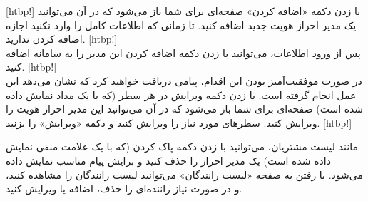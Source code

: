     [htbp!]
\newpage
         با زدن دکمه «اضافه کردن» صفحه‌ای برای شما باز می‌شود که در آن می‌توانید یک مدیر احراز هویت جدید اضافه کنید. تا زمانی که اطلاعات کامل را وارد نکنید اجازه اضافه کردن ندارید.
[htbp!]
\\
پس از ورود اطلاعات، می‌توانید با زدن دکمه اضافه کردن این مدیر را به سامانه اضافه کنید.
[htbp!]
\\
در صورت موفقیت‌آمیز بودن این اقدام، پیامی دریافت خواهید کرد که نشان می‌دهد این عمل انجام گرفته است.
 با زدن دکمه ویرایش در هر سطر (که با یک مداد نمایش داده شده است) صفحه‌ای برای شما باز می‌شود که در آن می‌توانید این مدیر احراز هویت را ویرایش کنید. سطرهای مورد نیاز را ویرایش کنید و دکمه «ویرایش» را بزنید.
[htbp!]

     مانند لیست مشتریان، می‌توانید با زدن دکمه پاک کردن (که با یک علامت منفی نمایش داده شده است) یک مدیر احراز را حذف کنید و برایش پیام مناسب نمایش داده می‌شود.
     با رفتن به صفحه «لیست رانندگان» می‌توانید لیست رانندگان را مشاهده کنید، و در صورت نیاز راننده‌ای را حذف، اضافه یا ویرایش کنید.


